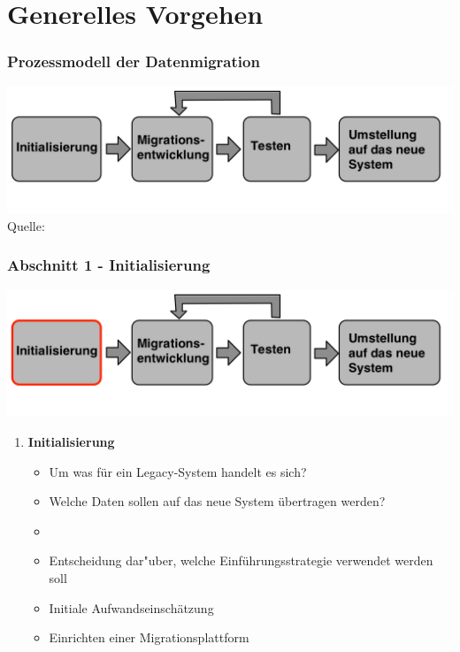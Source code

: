 \documentclass{beamer}
\begin{document}
	\section{Generelles Vorgehen}
	
	\begin{frame}
		\frametitle{Prozessmodell der Datenmigration}
		
		\centering
		\includegraphics[width=\textwidth]{../images/prozessmodellt.png}\\
		\tiny Quelle: \cite{klausMatthesSchulz-2012}
		
		
	\end{frame}
	
	\begin{frame}
		\frametitle{Abschnitt 1 - Initialisierung}
		
		\centering
		\includegraphics[width=\textwidth]{../images/prozessmodell1t.png}\\
	
		
		\begin{enumerate}
			\item \textbf{Initialisierung}
			\begin{itemize}
				\item Um was für ein Legacy-System handelt es sich?
				\item Welche Daten sollen auf das neue System übertragen werden?
				\item[]
				\item Entscheidung dar"uber, welche Einführungsstrategie verwendet werden soll
				\item Initiale Aufwandseinschätzung
				\item Einrichten einer Migrationsplattform
			\end{itemize}
		\end{enumerate}
	\end{frame}
	
\end{document}
